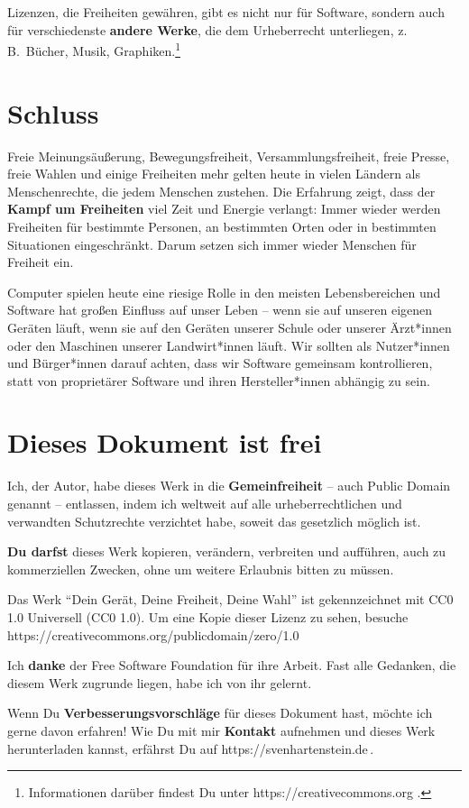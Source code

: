 \documentclass[a5paper,12pt]{scrartcl}
\begin{document}
Lizenzen, die Freiheiten gewähren, gibt es nicht nur für Software,
sondern auch für verschiedenste \textbf{andere Werke}, die dem
Urheberrecht unterliegen, z.\,B.\ Bücher, Musik,
Graphiken.\footnote{Informationen darüber findest Du unter
  https://creativecommons.org .}


\section{Schluss}

Freie Meinungsäußerung, Bewegungsfreiheit, Versammlungsfreiheit, freie
Presse, freie Wahlen und einige Freiheiten mehr gelten heute in vielen
Ländern als Menschenrechte, die jedem Menschen zustehen. Die Erfahrung
zeigt, dass der \textbf{Kampf um Freiheiten} viel Zeit und Energie
verlangt: Immer wieder werden Freiheiten für bestimmte Personen, an
bestimmten Orten oder in bestimmten Situationen eingeschränkt. Darum
setzen sich immer wieder Menschen für Freiheit ein.

Computer spielen heute eine riesige Rolle in den meisten
Lebensbereichen und Software hat großen Einfluss auf unser Leben --
wenn sie auf unseren eigenen Geräten läuft, wenn sie auf den Geräten
unserer Schule oder unserer Ärzt*innen oder den Maschinen unserer
Landwirt*innen läuft. Wir sollten als Nutzer*innen und Bürger*innen
darauf achten, dass wir Software gemeinsam kontrollieren, statt von
proprietärer Software und ihren Hersteller*innen abhängig zu sein.


\section{Dieses Dokument ist frei}

Ich, der Autor, habe dieses Werk in die \textbf{Gemeinfreiheit} --
auch Public Domain genannt -- entlassen, indem ich weltweit auf alle
urheberrechtlichen und verwandten Schutzrechte verzichtet habe, soweit
das gesetzlich möglich ist.

\textbf{Du darfst} dieses Werk kopieren, verändern, verbreiten und
aufführen, auch zu kommerziellen Zwecken, ohne um weitere Erlaubnis
bitten zu müssen.

Das Werk "`Dein Gerät, Deine Freiheit, Deine Wahl"' %
ist gekennzeichnet mit CC0 1.0 Universell (CC0
1.0). Um eine Kopie dieser Lizenz zu sehen,
besuche\\
https://creativecommons.org/publicdomain/zero/1.0

Ich \textbf{danke} der Free Software Foundation für ihre Arbeit. Fast
alle Gedanken, die diesem Werk zugrunde liegen, habe ich von ihr
gelernt.

Wenn Du \textbf{Verbesserungsvorschläge} für dieses Dokument hast,
möchte ich gerne davon erfahren! Wie Du mit mir \textbf{Kontakt}
aufnehmen und dieses Werk herunterladen kannst, erfährst Du auf
https://svenhartenstein.de\,.
\end{document}
